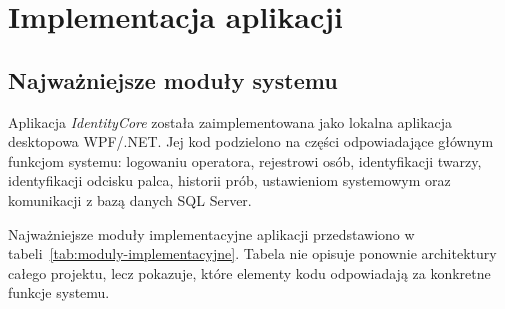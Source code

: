 \chapter{Implementacja aplikacji}
\label{chap:implementacja}

\section{Najważniejsze moduły systemu}

Aplikacja \textit{IdentityCore} została zaimplementowana jako lokalna aplikacja desktopowa WPF/.NET. Jej kod podzielono na części odpowiadające głównym funkcjom systemu: logowaniu operatora, rejestrowi osób, identyfikacji twarzy, identyfikacji odcisku palca, historii prób, ustawieniom systemowym oraz komunikacji z bazą danych SQL Server.

Najważniejsze moduły implementacyjne aplikacji przedstawiono w tabeli~\ref{tab:moduly-implementacyjne}. Tabela nie opisuje ponownie architektury całego projektu, lecz pokazuje, które elementy kodu odpowiadają za konkretne funkcje systemu.

